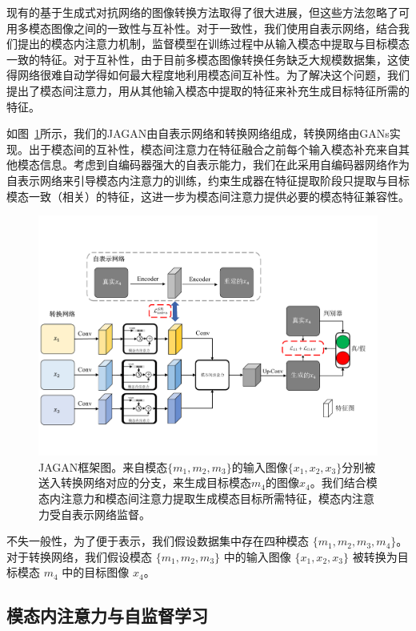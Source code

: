 现有的基于生成式对抗网络的图像转换方法取得了很大进展，但这些方法忽略了可用多模态图像之间的一致性与互补性。对于一致性，我们使用自表示网络，结合我们提出的模态内注意力机制，监督模型在训练过程中从输入模态中提取与目标模态一致的特征。对于互补性，由于目前多模态图像转换任务缺乏大规模数据集，这使得网络很难自动学得如何最大程度地利用模态间互补性。为了解决这个问题，我们提出了模态间注意力，用从其他输入模态中提取的特征来补充生成目标特征所需的特征。

如图~\ref{f1}所示，我们的JAGAN由自表示网络和转换网络组成，转换网络由GANs实现。出于模态间的互补性，模态间注意力在特征融合之前每个输入模态补充来自其他模态信息。考虑到自编码器强大的自表示能力，我们在此采用自编码器网络作为自表示网络来引导模态内注意力的训练，约束生成器在特征提取阶段只提取与目标模态一致（相关）的特征，这进一步为模态间注意力提供必要的模态特征兼容性。

\begin{figure}
    \centering
    \includegraphics[width=1\columnwidth]{figures/JAGAN/framework.pdf}
    \caption[aaa]{JAGAN框架图。来自模态$\{m_1, m_2, m_3\}$的输入图像$\{x_1, x_2, x_3\}$分别被送入转换网络对应的分支，来生成目标模态$m_4$的图像$x_4$。我们结合模态内注意力和模态间注意力提取生成模态目标所需特征，模态内注意力受自表示网络监督。}
    \label{f1}
\end{figure}

不失一般性，为了便于表示，我们假设数据集中存在四种模态 $\{m_1, m_2, m_3, m_4\}$。对于转换网络，我们假设模态 $\{m_1, m_2, m_3\}$ 中的输入图像 $\{x_1, x_2, x_3\}$ 被转换为目标模态 $m_4$ 中的目标图像 $x_4$。

\subsection{模态内注意力与自监督学习}


